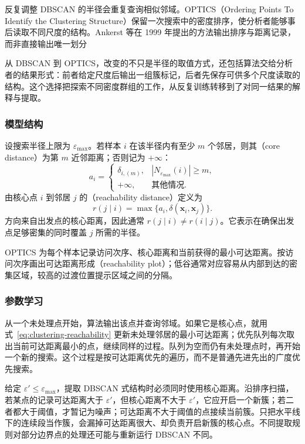 反复调整 DBSCAN 的半径会重复查询相似邻域。OPTICS（Ordering Points To Identify the Clustering Structure）保留一次搜索中的密度排序，使分析者能够事后读取不同尺度的结构。Ankerst 等在 1999 年提出的方法输出排序与距离记录，而非直接输出唯一划分

从 DBSCAN 到 OPTICS，改变的不只是半径的取值方式，还包括算法交给分析者的结果形式：前者给定尺度后输出一组簇标记，后者先保存可供多个尺度读取的结构。这个选择把探索不同密度群组的工作，从反复训练转移到了对同一结果的解释与提取。

\subsubsection{模型结构}

设搜索半径上限为 $\varepsilon_{\max}$。若样本 $i$ 在该半径内有至少 $m$ 个邻居，则其（core distance）为第 $m$ 近邻距离；否则记为 $+\infty$：
\[
 a_i=
 \begin{cases}
 \delta_{i,(m)},&|N_{\varepsilon_{\max}}(i)|\geq m,\\
 +\infty,&\text{其他情况}.
 \end{cases}
\]
由核心点 $i$ 到邻居 $j$ 的（reachability distance）定义为
\begin{equation}
 r(j\mid i)=\max\{a_i,\delta(\bm{x}_i,\bm{x}_j)\}.
 \label{eq:clustering-reachability}
\end{equation}
方向来自出发点的核心距离，因此通常 $r(j\mid i)\ne r(i\mid j)$。它表示在确保出发点足够密集的同时覆盖 $j$ 所需的半径。

OPTICS 为每个样本记录访问次序、核心距离和当前获得的最小可达距离。按访问次序画出可达距离形成（reachability plot）；低谷通常对应容易从内部到达的密集区域，较高的过渡位置提示区域之间的分隔。

\subsubsection{参数学习}

从一个未处理点开始，算法输出该点并查询邻域。如果它是核心点，就用式~\eqref{eq:clustering-reachability} 更新未处理邻居的最小可达距离；优先队列每次取出当前可达距离最小的点，继续同样的过程。队列为空而仍有未处理点时，再开始一个新的搜索。这个过程是按可达距离优先的遍历，而不是普通先进先出的广度优先搜索。

给定 $\varepsilon'\leq\varepsilon_{\max}$，提取 DBSCAN 式结构时必须同时使用核心距离。沿排序扫描，若某点的记录可达距离大于 $\varepsilon'$，但核心距离不大于 $\varepsilon'$，它应开启一个新簇；若二者都大于阈值，才暂记为噪声；可达距离不大于阈值的点接续当前簇。只把水平线下的连续段当作簇，会漏掉可达距离很大、却负责开启新簇的核心点。不同提取规则对部分边界点的处理还可能与重新运行 DBSCAN 不同。

